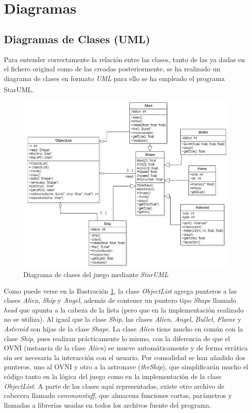 \section{Diagramas}
\subsection{Diagramas de Clases (UML)}
Para entender correctamente la relación entre las clases, tanto de las ya dadas en el fichero original como de las creadas posteriormente, se ha realizado un diagrama de clases en formato \emph{UML} para ello se ha empleado el programa StarUML\textsuperscript{\textregistered}.

\begin{figure}[h]
    \centering
    \includegraphics[width=\textwidth]{fotos/UML.PNG}
    \caption{Diagrama de clases del juego mediante \emph{StarUML}}
    \label{uml}
\end{figure}

Como puede verse en la Ilustración \ref{uml}, la clase \emph{ObjectList} agrega punteros a las clases \emph{Alien}, \emph{Ship} y \emph{Angel}, además de contener un puntero tipo \emph{Shape} llamado \textit{head} que apunta a la cabeza de la lista (pero que en la implementación realizado no se utiliza). Al igual que la clase \emph{Ship}, las clases \emph{Alien}, \emph{Angel}, \emph{Bullet}, \emph{Flame} y \emph{Asteroid} son hijas de la clase \emph{Shape}. La clase \emph{Alien} tiene mucho en común con la clase \emph{Ship}, pues realizan prácticamente lo mismo, con la diferencia de que el OVNI (instancia de la clase \emph{Alien}) se mueve automáticamente y de forma errática sin ser necesaria la interacción con el usuario. Por comodidad se han añadido dos punteros, uno al OVNI y otro a la astronave (\emph{theShip}), que simplificarán mucho el código tanto en la lógica del juego como en la implementación de la clase \emph{ObjectList}.
A parte de las clases aquí representadas, existe otro archivo de cabecera llamado \emph{commonstuff}, que almacena funciones cortas, parámetros y llamadas a librerías usadas en todos los archivos fuente del programa.
